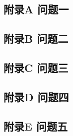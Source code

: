 \documentclass[a4paper, 12pt]{article}
\numberwithin{equation}{section}
\begin{document}
    {}


    {}


    {}
        \subsection*{附录A \hspace{2em} 问题一}
            

        \subsection*{附录B \hspace{2em} 问题二}

        \subsection*{附录C \hspace{2em} 问题三}

        \subsection*{附录D \hspace{2em} 问题四}

        \subsection*{附录E \hspace{2em} 问题五}
\end{document}
